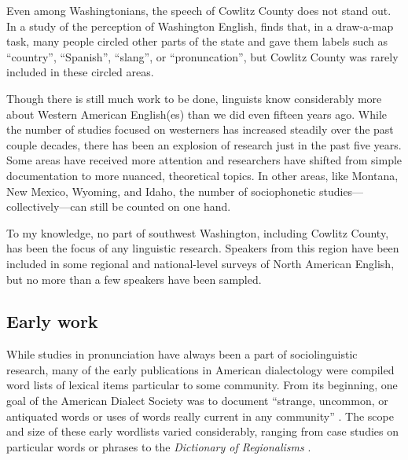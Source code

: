 Even among Washingtonians, the speech of Cowlitz County does not stand out. In a study of the perception of Washington English, \citet{evans_2011} finds that, in a draw-a-map task, many people circled other parts of the state and gave them labels such as ``country'', ``Spanish'', ``slang'', or ``pronuncation'', but Cowlitz County was rarely included in these circled areas.

Though there is still much work to be done, linguists know considerably more about Western American English(es) than we did even fifteen years ago. While the number of studies focused on westerners has increased steadily over the past couple decades, there has been an explosion of research just in the past five years. Some areas have received more attention and researchers have shifted from simple documentation to more nuanced, theoretical topics. In other areas, like Montana, New Mexico, Wyoming, and Idaho, the number of sociophonetic studies---collectively---can still be counted on one hand.

To my knowledge, no part of southwest Washington, including Cowlitz County, has been the focus of any linguistic research. Speakers from this region have been included in some regional and national-level surveys of North American English, but no more than a few speakers have been sampled.




\subsection{Early work}

While studies in pronunciation have always been a part of sociolinguistic research, many of the early publications in American dialectology were compiled word lists of lexical items particular to some community. From its beginning, one goal of the American Dialect Society was to document ``strange, uncommon, or antiquated words or uses of words really current in any community'' \citep[18]{sheldon_1889}. The scope and size of these early wordlists varied considerably, ranging from case studies on particular words or phrases \citep{pound_1929, pearce_1958} to the \textit{Dictionary of Regionalisms} \citep{bartlett_1848}.

